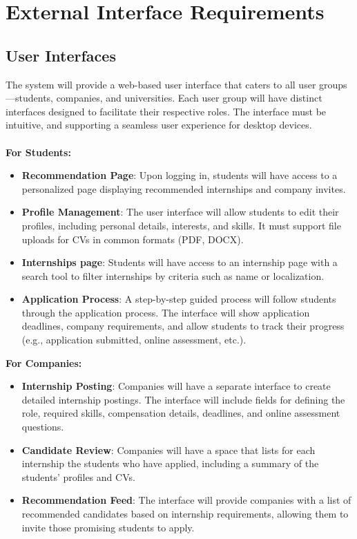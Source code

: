 \section{External Interface Requirements}

\subsection{User Interfaces}

The system will provide a web-based user interface that caters to all user groups—students, companies, and universities. Each user group will have distinct interfaces designed to facilitate their respective roles. The interface must be intuitive, and supporting a seamless user experience for desktop devices. \\ \\
\vspace{5mm}
\textbf{For Students:}
\begin{itemize}
    \item \textbf{Recommendation Page}: Upon logging in, students will have access to a personalized page displaying recommended internships and company invites.
    \item \textbf{Profile Management}: The user interface will allow students to edit their profiles, including personal details, interests, and skills. It must support file uploads for CVs in common formats (PDF, DOCX).
    \item \textbf{Internships page}: Students will have access to an internship page with a  search tool to filter internships by criteria such as name or localization.
    \item \textbf{Application Process}: A step-by-step guided process will follow students through the application process. The interface will show application deadlines, company requirements, and allow students to track their progress (e.g., application submitted, online assessment, etc.).
\end{itemize}
\vspace{5mm}
\textbf{For Companies:}
\begin{itemize}
    \item \textbf{Internship Posting}: Companies will have a separate interface to create detailed internship postings. The interface will include fields for defining the role, required skills, compensation details, deadlines, and online assessment questions.
    \item \textbf{Candidate Review}: Companies will have a space that lists for each internship the students who have applied, including a summary of the students' profiles and CVs.
    \item \textbf{Recommendation Feed}: The interface will provide companies with a list of recommended candidates based on internship requirements, allowing them to invite those promising students to apply.
\end{itemize}
